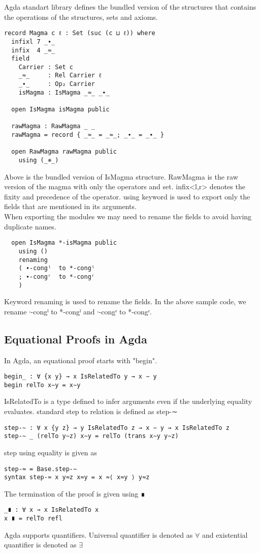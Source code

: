 Agda standart library defines the bundled version of the structures that contains the operations of the structures, sets and axioms. 
\begin{Verbatim}
record Magma c ℓ : Set (suc (c ⊔ ℓ)) where
  infixl 7 _∙_
  infix  4 _≈_
  field
    Carrier : Set c
    _≈_     : Rel Carrier ℓ
    _∙_     : Op₂ Carrier
    isMagma : IsMagma _≈_ _∙_

  open IsMagma isMagma public

  rawMagma : RawMagma _ _
  rawMagma = record { _≈_ = _≈_; _∙_ = _∙_ }

  open RawMagma rawMagma public
    using (_≉_)
\end{Verbatim}
Above is the bundled version of IsMagma structure. RawMagma is the raw version of the magma with only the operators and set. infix<l,r> denotes the fixity and precedence of the operator. using keyword is used to export only the fields that are mentioned in its arguments. \\
When exporting the modules we may need to rename the fields to avoid having duplicate names.
\begin{Verbatim}
  open IsMagma *-isMagma public
    using ()
    renaming
    ( ∙-congˡ  to *-congˡ
    ; ∙-congʳ  to *-congʳ
    )
\end{Verbatim} 
Keyword renaming is used to rename the fields. In the above sample code, we rename ∙-congˡ  to *-congˡ and ∙-congʳ  to *-congʳ.

\subsection{Equational Proofs in Agda}

In Agda, an equational proof starts with "begin". 
\begin{Verbatim}
begin_ : ∀ {x y} → x IsRelatedTo y → x ∼ y
begin relTo x∼y = x∼y
\end{Verbatim}
IsRelatedTo is a type defined to infer arguments even if the underlying equality evaluates. standard step to relation is defined as step-∼
\begin{Verbatim}
step-∼ : ∀ x {y z} → y IsRelatedTo z → x ∼ y → x IsRelatedTo z
step-∼ _ (relTo y∼z) x∼y = relTo (trans x∼y y∼z)
\end{Verbatim}
step using equality is given as
\begin{Verbatim}
step-≈ = Base.step-∼
syntax step-≈ x y≈z x≈y = x ≈⟨ x≈y ⟩ y≈z
\end{Verbatim}
The termination of the proof is given using \textunderscore ∎
\begin{Verbatim}
_∎ : ∀ x → x IsRelatedTo x
x ∎ = relTo refl
\end{Verbatim}
Agda supports quantifiers. Universal quantifier is denoted as \(\forall\) and existential quantifier is denoted as \(\exists\) 

